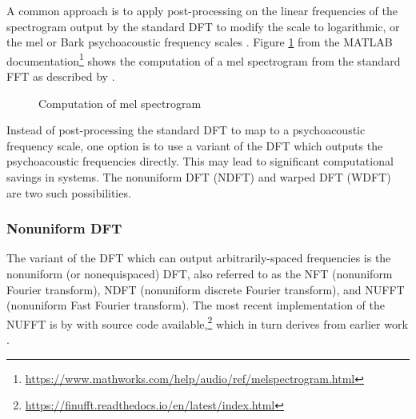 \documentclass[letter,12pt,notitlepage]{article}
\begin{document}
A common approach is to apply post-processing on the linear frequencies of the spectrogram output by the standard DFT to modify the scale to logarithmic, or the mel or Bark psychoacoustic frequency scales . Figure \ref{fig:melfilter} from the MATLAB documentation\footnote{\href{https://www.mathworks.com/help/audio/ref/melspectrogram.html}{https://www.mathworks.com/help/audio/ref/melspectrogram.html}} shows the computation of a mel spectrogram from the standard FFT as described by \citet[463]{melbook}.

\begin{figure}[ht]
	\centering
	\caption{Computation of mel spectrogram}
	\label{fig:melfilter}
\end{figure}

Instead of post-processing the standard DFT to map to a psychoacoustic frequency scale, one option is to use a variant of the DFT which outputs the psychoacoustic frequencies directly. This may lead to significant computational savings in systems. The nonuniform DFT (NDFT) and warped DFT (WDFT) are two such possibilities.

\subsubsection{Nonuniform DFT}

The variant of the DFT which can output arbitrarily-spaced frequencies is the nonuniform (or nonequispaced) DFT, also referred to as the NFT (nonuniform Fourier transform), NDFT (nonuniform discrete Fourier transform), and NUFFT (nonuniform Fast Fourier transform). The most recent implementation of the NUFFT is by \citet{nufft1} with source code available,\footnote{\href{https://finufft.readthedocs.io/en/latest/index.html}{https://finufft.readthedocs.io/en/latest/index.html}} which in turn derives from earlier work \cite{nufft2, nufft3}.
\end{document}
